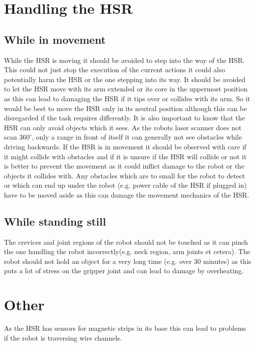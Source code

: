 \documentclass[main.tex]{subfiles}
\begin{document}
	\section{Handling the HSR}
	\subsection{While in movement}
	While the HSR is moving it should be avoided to step into the way of the HSR. This could not just stop the execution of the current actions it could also potentially harm the HSR or the one stepping into its way.
	It should be avoided to let the HSR move with its arm extended or its core in the uppermost position as this can lead to damaging the HSR if it tips over or collides with its arm. So it would be best to move the HSR only in its neutral position although this can be disregarded if the task requires differently.
	It is also important to know that the HSR can only avoid objects which it sees. As the robots laser scanner does not scan $360^\circ$, only a range in front of itself it can generally not see obstacles while driving backwards.
	If the HSR is in movement it should be observed with care if it might collide with obstacles and if it is unsure if the HSR will collide or not it is better to prevent the movement as it could inflict damage to the robot or the objects it collides with.
	Any obstacles which are to small for the robot to detect or which can end up under the robot (e.g. power cable of the HSR if plugged in) have to be moved aside as this can damage the movement mechanics of the HSR.
	\subsection{While standing still}
	The crevices and joint regions of the robot should not be touched as it can pinch the one handling the robot incorrectly(e.g. neck region, arm joints et cetera).
	The robot should not hold an object for a very long time (e.g. over 30 minutes) as this puts a lot of stress on the gripper joint and can lead to damage by overheating.
	\section{Other}
	As the HSR has sensors for magnetic strips in its base this can lead to problems if the robot is traversing wire channels.
\end{document}
